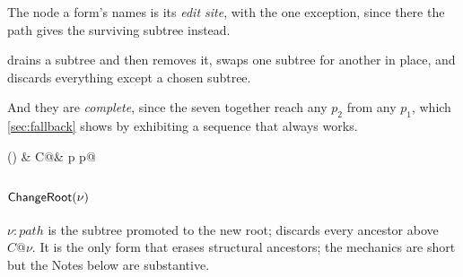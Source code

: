 
The node a form's \pth names is its \emph{edit site}, with \ChangeRoot{} the one exception, since there the path gives the surviving subtree instead.



\Retire{} drains a subtree and then removes it, \Replace{} swaps one subtree for another in place, and \PruneDownTo{} discards everything except a chosen subtree.



And they are \emph{complete}, since the seven together reach any \(p_2\) from any \(p_1\), which \cref{sec:fallback} shows by exhibiting a sequence that always works.



\ChangeRoot(\nu) & C@\nu & p \mapsto p@\nu



\subsubsection{\texorpdfstring{\(\textsf{ChangeRoot}(\nu)\)}{ChangeRoot}}\label{sec:changeroot}


\(\nu : \mathit{path}\) is the subtree promoted to the new root; \ChangeRoot{} discards every ancestor above \(C@\nu\).
It is the only form that erases structural ancestors; the mechanics are short but the Notes below are substantive.

